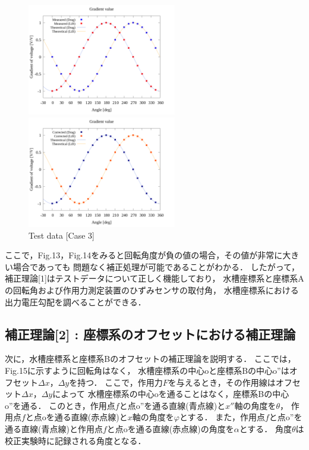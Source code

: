 \begin{figure}[htbp]
  \begin{minipage}[b]{0.45\linewidth}
    \centering
    \includegraphics[width=65mm]{../../02_workspace/result/rotation_tx=90.0_ty=-90.0/plot/20/20_adjust-value.png}
  \end{minipage}
  \begin{minipage}[b]{0.45\linewidth}
    \centering
    \includegraphics[width=65mm]{../../02_workspace/result/rotation_tx=90.0_ty=-90.0/plot/21/21-4_summary.png}
  \end{minipage}
  \caption{Test data [Case 3]}
\end{figure}

ここで，Fig.13，Fig.14をみると回転角度が負の値の場合，その値が非常に大きい場合であっても
問題なく補正処理が可能であることがわかる．
したがって，補正理論[1]はテストデータについて正しく機能しており，
水槽座標系と座標系Aの回転角および作用力測定装置のひずみセンサの取付角，
水槽座標系における出力電圧勾配を調べることができる．

\newpage
\subsection{補正理論[2] : 座標系のオフセットにおける補正理論}

次に，水槽座標系と座標系Bのオフセットの補正理論を説明する．
ここでは，Fig.15に示すように回転角はなく，
水槽座標系の中心oと座標系Bの中心o''はオフセット$\Delta x$，$\Delta y$を持つ．
ここで，作用力$F$を与えるとき，その作用線はオフセット$\Delta x$，$\Delta y$によって
水槽座標系の中心oを通ることはなく，座標系Bの中心o''を通る．
このとき，作用点$f$と点o''を通る直線(青点線)と$x''$軸の角度を$\theta$，
作用点$f$と点oを通る直線(赤点線)と$x$軸の角度を$\varphi$とする．
また，作用点$f$と点o''を通る直線(青点線)と作用点$f$と点oを通る直線(赤点線)の角度を$\alpha$とする．
角度$\theta$は校正実験時に記録される角度となる．

